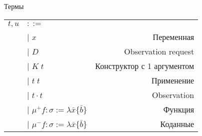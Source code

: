 \documentclass[10pt, mathserif]{beamer}
\let\\\tabularnewline
\let\\\tabularnewline
\newcommand{\graybox}[1]{\colorbox{light-gray}{#1}}
\theoremstyle{definition}
\begin{document}
\begin{frame}[c]{Термы}
\begin{tabular}{ l l r }
  $t,u $&$::=$ & \\
  &|  $x$ & Переменная \\
  &|  $D$ & \graybox{Observation request}\\
  &|  $K\; t$ & \graybox{Конструктор с 1 аргументом} \\
  &|  $t\; t$ & Применение  \\
  &|  $t \cdot t$  & \graybox{Observation}  \\
  &|  $\mu^+ f: \sigma := \lambda \bar{x}\{\bar{b}\}$ & Функция  \\
  &|  $\mu^- f: \sigma := \lambda \bar{x}\{\bar{b}\}$ & Коданные \\
\end{tabular}




\end{frame}
\end{document}
